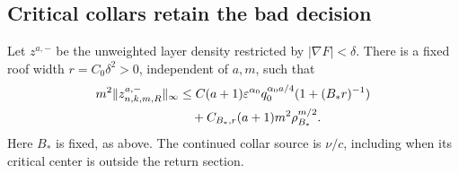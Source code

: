 \subsection{Critical collars retain the bad decision}
\begin{proposition}
\label{prop:v48-low-depth}
Let $z^{a,-}$ be the unweighted layer density restricted by
$|\nabla F|<\delta$. There is a fixed roof width $r=C_0\delta^2>0$,
independent of $a,m$, such that
\begin{align}
 m^2\|z^{a,-}_{n,k,m,R}\|_\infty
 &\le C(a+1)\varepsilon^{\alpha_0}q_0^{\alpha_0a/4}
                       (1+(B_*r)^{-1})\notag\\
 &\quad+C_{B_*,r}(a+1)m^2\rho_{B_*}^{m/2}.
                                      \label{eq:v48-low-depth}
\end{align}
Here $B_*$ is fixed, as above. The continued collar source is $\nu/c$,
including when its critical center is outside the return section.
\end{proposition}
